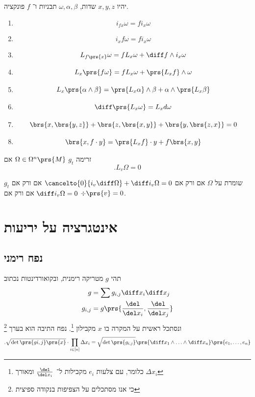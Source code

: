 \documentclass[a4paper,10pt,twoside,openany]{book}
\begin{document}
\begin{exercise}
יהיו
$x,y,z$
שדות,
$\omega,\alpha,\beta$
תבניות ו־%
$f$
פונקציה.
\begin{enumerate}
\item \[i_{f x} \omega = f i_x \omega\]
\item \[i_x f\omega = f i_x \omega\]
\item \[L_{f\prs{x}} \omega = f L_x \omega + \diff f \wedge i_x \omega\]
\item \[L_x \prs{f \omega} = f L_x \omega + \prs{L_x f} \wedge \omega\]
\item \[L_x\prs{\alpha \wedge \beta} = \prs{L_x \alpha} \wedge \beta + \alpha\wedge \prs{L_x \beta}\]
\item \[\diff \prs{L_x \omega} = L_x d\omega\]
\item \[\brs{x,\brs{y,z}} + \brs{z,\brs{x,y}} + \brs{y,\brs{z,x}} = 0\]
\item \[\brs{x, f\cdot y} = \prs{L_x f} \cdot y + f \brs{x,y}\]
\end{enumerate}
\end{exercise}

\begin{definition}
זרימה
$g_t$
$\Omega \in \Omega^n \prs{M}$
אם
\[\text{.} L_v \Omega = 0\]
\end{definition}
\begin{corollary}
$g_t$
שומרת על
$\Omega$
אם ורק אם
$\cancelto{0}{i_v \diff \Omega} + \diff i_v \Omega = 0$
אם ורק אם
$\diff i_v \Omega = 0$
אם ורק אם
$\div \prs{v} = 0$.
\end{corollary}

\chapter{אינטגרציה על יריעות}

\section{נפח רימני}

תהי
$g$
מטריקה רימנית, ובקואורדינטות נכתוב
\begin{align*}
g &= \sum g_{i,j} \diff x_i \diff x_j \\
g_{i,j} &= g\prs{\frac{\del}{\del x_i}, \frac{\del}{\del x_j}}
\end{align*}
ונסתכל ראשית על המקרה בו
$x$
מקבילון%
\footnote{כלומר, עם צלעות
$e_i$
מקבילות ל־%
$\frac{\del}{\del x_i}$
ומאורך
$\Delta x_i$}.
נפח התיבה הוא בערך%
\footnote{כי אנו מסתכלים על הצפיפות בנקודה ספיצית}
\begin{align*}
\text{.} \sqrt{\det\prs{g{i,j}} \prs{x}} \cdot \prod_{i\in[n]} \Delta x_i = \sqrt{\det \prs{g_{i,j}}} \prs{\diff x_1 \wedge \ldots \wedge \diff x_n}\prs{e_1, \ldots, e_n}
\end{align*}
\end{document}
